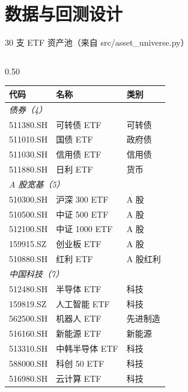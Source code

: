 \documentclass[aspectratio=169,11pt]{beamer}
\newcommand{\etfCount}{30}
\begin{document}
\section{数据与回测设计}

\begin{frame}{\etfCount{} 支 ETF 资产池（来自 src/asset\_universe.py）}
  \fontsize{6.2}{7.4}\selectfont
  \renewcommand{\arraystretch}{1.0}
  \begin{columns}[T]
    \begin{column}{0.50\textwidth}
      \begin{tabular}{@{}lll@{}}
        \toprule
        代码 & 名称 & 类别 \\
        \midrule
        \multicolumn{3}{l}{\textit{债券（4）}} \\
        511380.SH & 可转债 ETF & 可转债 \\
        511010.SH & 国债 ETF & 政府债 \\
        511030.SH & 信用债 ETF & 信用债 \\
        511880.SH & 日利 ETF & 货币 \\
        \midrule
        \multicolumn{3}{l}{\textit{A 股宽基（5）}} \\
        510300.SH & 沪深 300 ETF & A 股 \\
        510500.SH & 中证 500 ETF & A 股 \\
        512100.SH & 中证 1000 ETF & A 股 \\
        159915.SZ & 创业板 ETF & A 股 \\
        510880.SH & 红利 ETF & A 股红利 \\
        \midrule
        \multicolumn{3}{l}{\textit{中国科技（7）}} \\
        512480.SH & 半导体 ETF & 科技 \\
        159819.SZ & 人工智能 ETF & 科技 \\
        562500.SH & 机器人 ETF & 先进制造 \\
        516160.SH & 新能源 ETF & 新能源 \\
        513310.SH & 中韩半导体 ETF & 科技 \\
        588000.SH & 科创 50 ETF & 科技 \\
        516980.SH & 云计算 ETF & 科技 \\
        \bottomrule
      \end{tabular}
    \end{column}

\end{columns}
\end{frame}
\end{document}
